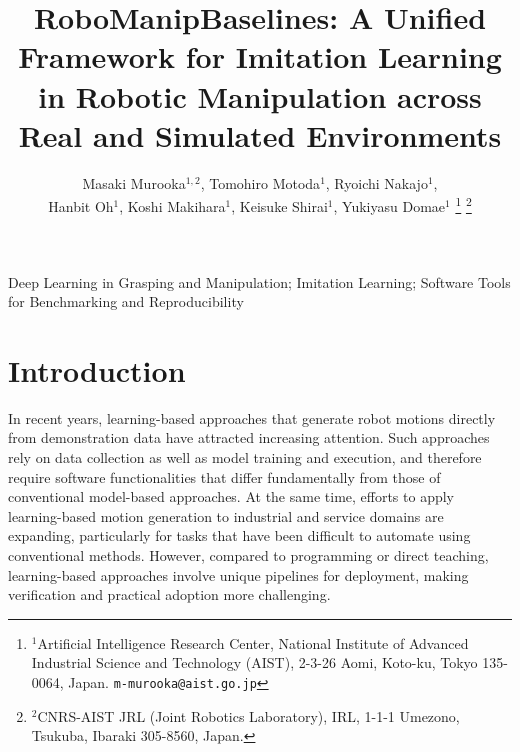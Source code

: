 \documentclass[letterpaper, 10 pt, conference]{ieeeconf}  %
\title{\LARGE \bf
  RoboManipBaselines: A Unified Framework for Imitation Learning in Robotic Manipulation across Real and Simulated Environments
}
\author{
Masaki Murooka$^{1,2}$, Tomohiro Motoda$^{1}$, Ryoichi Nakajo$^{1}$, \\Hanbit Oh$^{1}$, Koshi Makihara$^{1}$, Keisuke Shirai$^{1}$, Yukiyasu Domae$^{1}$%
\thanks{$^{1}$Artificial Intelligence Research Center,
National Institute of Advanced Industrial Science and Technology (AIST),
2-3-26 Aomi, Koto-ku, Tokyo 135-0064, Japan.
{\tt\small m-murooka@aist.go.jp}}%
\thanks{$^{2}$CNRS-AIST JRL (Joint Robotics Laboratory), IRL,
1-1-1 Umezono, Tsukuba, Ibaraki 305-8560, Japan.}%
}
\begin{document}
\maketitle
\thispagestyle{empty}
\pagestyle{empty}

\setlength{\floatsep}{8pt}
\setlength{\textfloatsep}{8pt}
\setlength{\abovecaptionskip}{4pt}
\setlength{\abovedisplayskip}{4pt}
\setlength{\belowdisplayskip}{4pt}

\begin{abstract}
\end{abstract}

\begin{keywords}
  Deep Learning in Grasping and Manipulation; Imitation Learning; Software Tools for Benchmarking and Reproducibility
\end{keywords}

\section{Introduction}

In recent years, learning-based approaches that generate robot motions directly from demonstration data have attracted increasing attention.
Such approaches rely on data collection as well as model training and execution, and therefore require software functionalities that differ fundamentally from those of conventional model-based approaches.
At the same time, efforts to apply learning-based motion generation to industrial and service domains are expanding, particularly for tasks that have been difficult to automate using conventional methods.
However, compared to programming or direct teaching, learning-based approaches involve unique pipelines for deployment, making verification and practical adoption more challenging.
\end{document}
